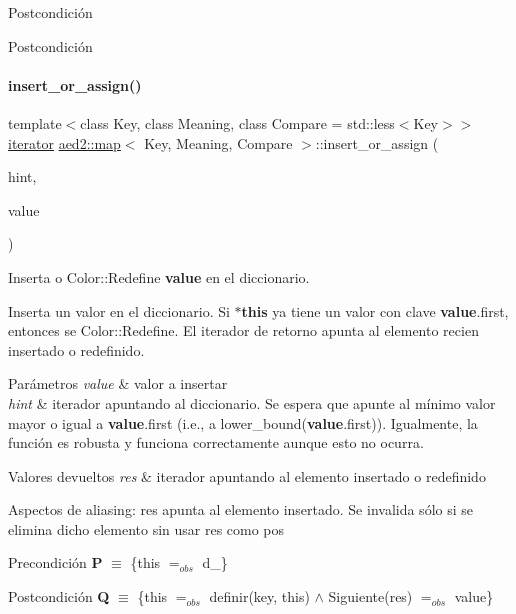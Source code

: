 \begin{DoxyPostcond}{\-Postcondición}
\begin{DoxyPostcond}{\-Postcondición}
\paragraph{\texorpdfstring{insert\+\_\+or\+\_\+assign()}{insert\_or\_assign()}\hspace{0.1cm}{\footnotesize\ttfamily [1/2]}}
{\footnotesize\ttfamily template$<$class Key, class Meaning, class Compare = std\+::less$<$\+Key$>$$>$ \\
\hyperlink{classaed2_1_1map_1_1iterator}{iterator} \hyperlink{classaed2_1_1map}{aed2\+::map}$<$ Key, Meaning, Compare $>$\+::insert\+\_\+or\+\_\+assign (\begin{DoxyParamCaption}\item[{\hyperlink{classaed2_1_1map_1_1const__iterator}{const\+\_\+iterator}}]{hint,  }\item[{const \hyperlink{classaed2_1_1map_a719db98e0ff9a837610f76be33264680_a719db98e0ff9a837610f76be33264680}{value\+\_\+type} \&}]{value }\end{DoxyParamCaption})\hspace{0.3cm}{\ttfamily [inline]}}



Inserta o Color\+::\+Redefine {\bfseries value} en el diccionario. 

Inserta un valor en el diccionario. Si {\bfseries $\ast$this} ya tiene un valor con clave {\bfseries value}.first, entonces se Color\+::\+Redefine. El iterador de retorno apunta al elemento recien insertado o redefinido.


\begin{DoxyParams}{Parámetros}
{\em value} & valor a insertar \\
\hline
{\em hint} & iterador apuntando al diccionario. Se espera que apunte al mínimo valor mayor o igual a {\bfseries value}.first (i.\+e., a lower\+\_\+bound({\bfseries value}.first)). Igualmente, la función es robusta y funciona correctamente aunque esto no ocurra. \\
\hline
\end{DoxyParams}

\begin{DoxyRetVals}{Valores devueltos}
{\em res} & iterador apuntando al elemento insertado o redefinido\\
\hline
\end{DoxyRetVals}
\begin{DoxyParagraph}{Aspectos de aliasing\+:}
res apunta al elemento insertado. Se invalida sólo si se elimina dicho elemento sin usar res como pos
\end{DoxyParagraph}
\begin{DoxyPrecond}{Precondición}
{\bfseries P} $\equiv$ \{this $=_{obs}$ d\+\_\} 
\end{DoxyPrecond}
\begin{DoxyPostcond}{Postcondición}
{\bfseries Q} $\equiv$ \{this $=_{obs}$ definir(key, this) $\land$ Siguiente(res) $=_{obs}$ value\}
\end{DoxyPostcond}


\end{DoxyPostcond}
\end{DoxyPostcond}
